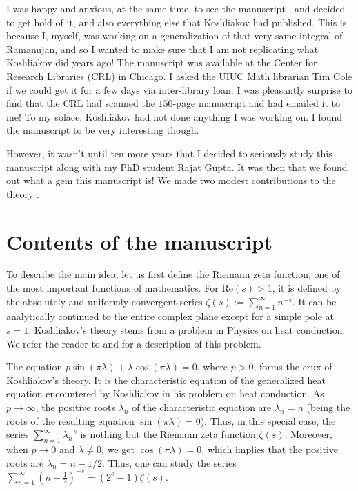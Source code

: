 \documentclass[12pt,reqno]{amsart}
\renewcommand{\(}{\left\(}
\renewcommand{\)}{\right\)}
\renewcommand{\[}{\left\[}
\renewcommand{\]}{\right\]}
\numberwithin{equation}{section}
\theoremstyle{plain}
\begin{document}
 I was happy and anxious, at the same time, to see the manuscript \cite{koshliakov3}, and decided to get hold of it, and also everything else that Koshliakov had published. This is because I, myself, was working on a generalization of that very same integral of Ramanujan, and so I wanted to make sure that I am not replicating what Koshliakov did years ago! The manuscript was available at the Center for Research Libraries (CRL) in Chicago. I asked the UIUC Math librarian Tim Cole if we could get it for a few days via inter-library loan. I was pleasantly surprise to find that the CRL had scanned the $150$-page manuscript and had emailed it to me! To my solace, Koshliakov had not done anything I was working on. I found the manuscript to be very interesting though.
 
 However, it wasn't until ten more years that I decided to seriously study this manuscript along with my PhD student Rajat Gupta. It was then that we found out what a gem this manuscript is! We made two modest contributions to the theory \cite{dixitgupta}.
 
 \section{Contents of the manuscript}
To describe the main idea, let us first define the Riemann zeta function, one of the most important functions of mathematics. For Re$(s)>1$, it is defined by the absolutely and uniformly convergent series $\zeta(s):=\sum_{n=1}^{\infty}n^{-s}$.
 It can be analytically continued to the entire complex plane except for a simple pole at $s=1$.
 Koshliakov's theory stems from a problem in Physics on heat conduction. We refer the reader to \cite{koshbernoulli} and \cite[p.~488-489]{de} for a description of this problem. 
 
 The equation $p \sin(\pi \lambda)+\lambda \cos(\pi \lambda)=0$, where $p>0$, forms
 the crux of Koshliakov’s theory. It is the characteristic equation of the generalized heat equation encountered by Koshliakov in his problem on heat conduction. As $p \to \infty$, the positive roots $\lambda_n$ of the characteristic equation are $\lambda_n=n$ (being the roots of the resulting equation $\sin(\pi\lambda)=0$). Thus, in this special case, the series $\sum_{n=1}^{\infty}\lambda_n^{-s}$ is nothing but the Riemann zeta function $\zeta(s)$. Moreover, when $p\to0$ and $\lambda\neq0$, we get $\cos(\pi\lambda)=0$, which implies that the positive roots are $\lambda_n=n-1/2$. 
 Thus, one can study the series $\sum_{n=1}^{\infty}\left(n-\frac{1}{2}\right)^{-s}=(2^s-1)\zeta(s)$.  
 
\end{document}
